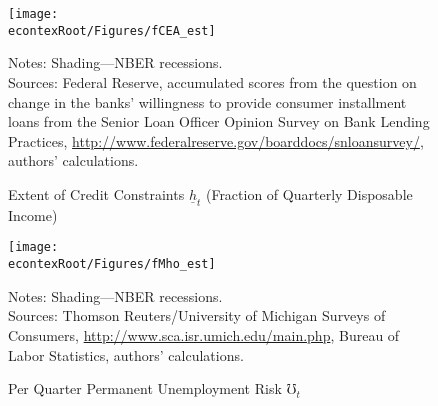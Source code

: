 \documentclass[titlepage]{\econtex}
\begin{document}
\hypertarget{fCEA-est}{}
\begin{figure}
\caption{Extent of Credit Constraints $\underline{h}_t$ (Fraction of Quarterly Disposable Income) \label{tMbar}}
\texttt{[image: \\econtexRoot/Figures/fCEA\_est]}

\footnotesize
Notes: Shading---NBER recessions.\\[0mm]
\tiny Sources: Federal Reserve, accumulated scores from the question on change in the banks' willingness to provide consumer installment loans from the Senior Loan Officer Opinion Survey on Bank Lending Practices, \url{http://www.federalreserve.gov/boarddocs/snloansurvey/}, authors' calculations.
\end{figure}

\hypertarget{tMhoRescaled}{}
\begin{figure}
\caption{Per Quarter Permanent Unemployment Risk $\mho_t$  \label{tMhoRescaled}}
\texttt{[image: \\econtexRoot/Figures/fMho\_est]}

\footnotesize
Notes: Shading---NBER recessions.\\[0mm]
\tiny Sources: Thomson Reuters/University of Michigan Surveys of Consumers, \url{http://www.sca.isr.umich.edu/main.php}, Bureau of Labor Statistics, authors' calculations.
\end{figure}
\end{document}
